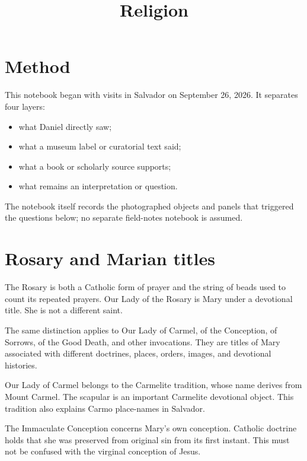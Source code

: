 



\title{Religion}
\maketitle

\label{section-phantom}

\tableofcontents

\section{Method}
\label{section-religion-method}

This notebook began with visits in
Salvador on September 26, 2026.  It
separates four layers:

\begin{itemize}
\item what Daniel directly saw;
\item what a museum label or curatorial
text said;
\item what a book or scholarly source
supports;
\item what remains an interpretation or
question.
\end{itemize}

The notebook itself records the photographed
objects and panels that triggered the
questions below; no separate field-notes
notebook is assumed.

\section{Rosary and Marian titles}
\label{section-rosary-marian-titles}

The Rosary is both a Catholic form of
prayer and the string of beads used to
count its repeated prayers.  Our Lady of
the Rosary is Mary under a devotional
title.  She is not a different saint.

The same distinction applies to Our Lady
of Carmel, of the Conception, of Sorrows,
of the Good Death, and other invocations.
They are titles of Mary associated with
different doctrines, places, orders,
images, and devotional histories.

Our Lady of Carmel belongs to the
Carmelite tradition, whose name derives
from Mount Carmel.  The scapular is an
important Carmelite devotional object.
This tradition also explains Carmo
place-names in Salvador.

The Immaculate Conception concerns Mary's
own conception.  Catholic doctrine holds
that she was preserved from original sin
from its first instant.  This must not be
confused with the virginal conception of
Jesus.

